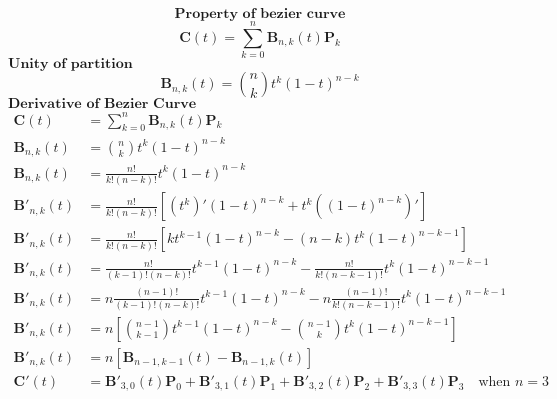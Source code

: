 \documentclass{article}
\begin{document}
\newtheorem{theorem}{Theorem}[section]
\newtheorem{defn}{Definition}[section]
\setlength\parindent{0pt}

\[ \textbf{Property of bezier curve} \]
\[ \textbf{C}(t) = \sum_{k=0}^{n} \textbf{B}_{n,k}(t) \textbf{P}_k\]
$\textbf{Unity of partition}$ 
\[ \textbf{B}_{n,k}(t) = \binom{n}{k} t^k (1-t)^{n-k} \]
$ \textbf{Derivative of Bezier Curve} $
\begin{equation}
\begin{aligned} 
    \textbf{C}(t) &= \sum_{k=0}^{n} \textbf{B}_{n,k}(t) \textbf{P}_k \\
    \textbf{B}_{n,k}(t) &= \binom{n}{k} t^{k} (1-t)^{n-k} \\
    \textbf{B}_{n,k}(t) &= \frac{n!}{k!(n-k)!} t^{k} (1-t)^{n-k} \\
    \textbf{B}'_{n,k}(t) &= \frac{n!}{k!(n-k)!}\left[ (t^{k})' (1-t)^{n-k} + t^{k}((1-t)^{n-k})' \right] \\
    \textbf{B}'_{n,k}(t) &= \frac{n!}{k!(n-k)!}\left[ k t^{k-1} (1-t)^{n-k} - (n-k)t^{k}(1-t)^{n-k-1} \right] \\
    \textbf{B}'_{n,k}(t) &= \frac{n!}{(k-1)!(n-k)!} t^{k-1} (1-t)^{n-k} - \frac{n!}{k!(n-k-1)!} t^{k} (1-t)^{n-k-1} \\
    \textbf{B}'_{n,k}(t) &= n\frac{(n-1)!}{(k-1)!(n-k)!} t^{k-1} (1-t)^{n-k} - n\frac{(n-1)!}{k!(n-k-1)!} t^{k} (1-t)^{n-k-1} \\
    \textbf{B}'_{n,k}(t) &= n \left[ \binom{n-1}{k-1} t^{k-1} (1-t)^{n-k} - \binom{n-1}{k} t^{k} (1-t)^{n-k-1} \right] \\
    \textbf{B}'_{n,k}(t) &= n \left[ \textbf{B}_{n-1,k-1}(t) - \textbf{B}_{n-1,k}(t) \right] \\
    \textbf{C}'(t) &= \textbf{B}'_{3,0}(t) \textbf{P}_0  + \textbf{B}'_{3,1}(t)\textbf{P}_1 + \textbf{B}'_{3,2}(t) \textbf{P}_2 + \textbf{B}'_{3,3}(t)\textbf{P}_3 \quad \text{when } n = 3 \nonumber \\
\end{aligned} 
\end{equation} \\
\end{document}
